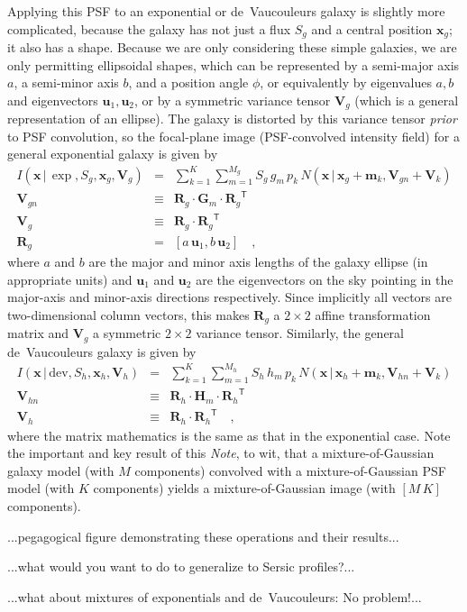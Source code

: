 \documentclass[12pt]{article}
\newcommand{\documentname}{\textsl{Note}}
\newcommand{\tmatrix}[1]{\boldsymbol{#1}}
\newcommand{\transpose}[1]{{#1}^{\mathsf T}}
\newcommand{\tvector}[1]{\boldsymbol{#1}}
\newcommand{\pos}{\tvector{x}}
\newcommand{\mean}{\tvector{m}}
\newcommand{\var}{\tmatrix{V}\!}
\newcommand{\Gm}{\tmatrix{G}}
\newcommand{\Hm}{\tmatrix{H}}
\newcommand{\affine}{\tmatrix{R}}
\newcommand{\uv}{\tvector{u}}
\newcommand{\normal}{N}
\newcommand{\given}{\,|\,}
\newcommand{\dev}{\mathrm{dev}}
\begin{document}
Applying this PSF to an exponential or de~Vaucouleurs galaxy is
slightly more complicated, because the galaxy has not just a flux
$S_g$ and a central position $\pos_g$; it also has a shape.  Because
we are only considering these simple galaxies, we are only permitting
ellipsoidal shapes, which can be represented by a semi-major axis $a$,
a semi-minor axis $b$, and a position angle $\phi$, or equivalently by
eigenvalues $a, b$ and eigenvectors $\uv_1, \uv_2$, or by a symmetric
variance tensor $\var_g$ (which is a general representation of an
ellipse).  The galaxy is distorted by this variance tensor
\emph{prior} to PSF convolution, so the focal-plane image
(PSF-convolved intensity field) for a general exponential galaxy is
given by
\begin{eqnarray}\displaystyle
I(\pos\given\exp,S_g,\pos_g,\var_g) &=& \sum_{k=1}^K \sum_{m=1}^{M_g} S_g\,g_m\,p_k\,\normal(\pos\given\pos_g+\mean_k,\var_{gn}+\var_k)
\\
\var_{gn} &\equiv& \affine_g\cdot\Gm_m\cdot\transpose{\affine_g}
\\
\var_g &\equiv& \affine_g\cdot\transpose{\affine_g}
\\
\affine_g &=& \left[a\,\uv_1 , b\,\uv_2 \right]
\quad ,
\end{eqnarray}
where $a$ and $b$ are the major and minor axis lengths of the galaxy
ellipse (in appropriate units) and $\uv_1$ and $\uv_2$ are the
eigenvectors on the sky pointing in the major-axis and minor-axis
directions respectively.  Since implicitly all vectors are
two-dimensional column vectors, this makes $\affine_g$ a $2\times 2$
affine transformation matrix and $\var_g$ a symmetric $2\times 2$
variance tensor.  Similarly, the general de~Vaucouleurs galaxy is
given by
\begin{eqnarray}\displaystyle
I(\pos\given\dev,S_h,\pos_h,\var_h) &=& \sum_{k=1}^K \sum_{m=1}^{M_h} S_h\,h_m\,p_k\,\normal(\pos\given\pos_h+\mean_k,\var_{hn}+\var_k)
\\
\var_{hn} &\equiv& \affine_h\cdot\Hm_m\cdot\transpose{\affine_h}
\\
\var_h &\equiv& \affine_h\cdot\transpose{\affine_h}
\quad ,
\end{eqnarray}
where the matrix mathematics is the same as that in the exponential
case.  Note the important and key result of this \documentname, to
wit, that a mixture-of-Gaussian galaxy model (with $M$ components)
convolved with a mixture-of-Gaussian PSF model (with $K$ components)
yields a mixture-of-Gaussian image (with $[M\,K]$ components).

...pegagogical figure demonstrating these operations and their results...

...what would you want to do to generalize to Sersic profiles?...

...what about mixtures of exponentials and de~Vaucouleurs:  No problem!...
\end{document}
